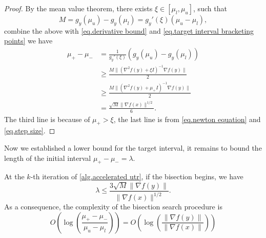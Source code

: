 \documentclass{article}
\begin{document}
\begin{proof}
    By the mean value theorem, there exists $\xi\in \left [\mu_l,\mu_u\right]$, such that
    \begin{equation*}
        M=g_y(\mu_u)-g_y(\mu_l) = g_y'(\xi)(\mu_u-\mu_l),
    \end{equation*}
    combine the above with \eqref{eq.derivative bound} and \eqref{eq.target interval bracketing points} we have
    \begin{equation*}
        \begin{aligned}
            \mu_+-\mu_- &=  \frac{1}{g_y'(\xi)}\left(g_y(\mu_u)-g_y(\mu_l)\right)\\
            &\geq \frac{M\|\left (\nabla ^2 f(y)+\xi I \right )^{-1}\nabla f(y)\|}{2}\\
            &\geq \frac{M\|\left (\nabla ^2 f(y)+\mu_+ I \right )^{-1}\nabla f(y)\|}{2}\\
            &= \frac{\sqrt{M}\|\nabla f(x)\|^{1/2}}{6}.
        \end{aligned}
    \end{equation*}
    The third line is because of $\mu_+ >\xi$, the last line is from \eqref{eq.newton equation} and \eqref{eq.step size}.
\end{proof}
Now we established a lower bound for the target interval, it remains to bound the length of the initial interval $\mu_+ -\mu_- = \lambda$.
\begin{lemma}
    \label{lem.bound initial interval}
    At the $k$-th iteration of \autoref{alg.accelerated utr}, if the bisection begins, we have 
    \begin{equation*}
    \lambda\leq \frac{3\sqrt{M}\|\nabla f(y)\|}{\|\nabla f(x)\|^{1/2}}.
    \end{equation*}
    As a consequence, the complexity of the bisection search procedure is 
    \begin{equation}
        \label{eq.complexity bisection}
        O \left (\log \left( \frac{\mu_+-\mu_-}{\mu_u-\mu_l}\right)\right)= O\left (\log \left(\frac{\|\nabla f(y)\|}{\|\nabla f(x)\|}\right)\right)
    \end{equation}
\end{lemma}
\end{document}
